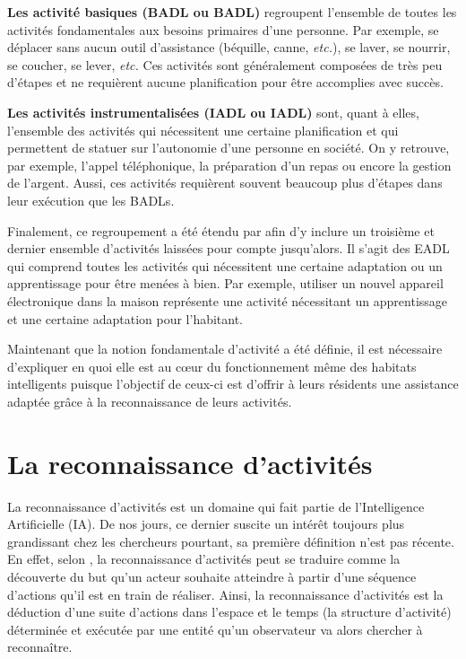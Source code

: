 {\textbf{Les activité basiques (\acl{BADL} ou \acs{BADL})} regroupent l'ensemble de toutes les activités fondamentales aux besoins primaires d'une personne. Par exemple, se déplacer sans aucun outil d'assistance (béquille, canne, \textit{etc.}), se laver, se nourrir, se coucher, se lever, \textit{etc.} Ces activités sont généralement composées de très peu d'étapes et ne requièrent aucune planification pour être accomplies avec succès.

{\textbf{Les activités instrumentalisées (\acl{IADL} ou \acs{IADL})} sont, quant à elles, l'ensemble des activités qui nécessitent une certaine planification et qui permettent de statuer sur l'autonomie d'une personne en société. On y retrouve, par exemple, l'appel téléphonique, la préparation d'un repas ou encore la gestion de l'argent. Aussi, ces activités requièrent souvent beaucoup plus d'étapes dans leur exécution que les \acsp{BADL}.

Finalement, ce regroupement a été étendu par \cite{Rogers1998} afin d'y inclure un troisième et dernier ensemble d'activités laissées pour compte jusqu'alors. Il s'agit des \ac{EADL} qui comprend toutes les activités qui nécessitent une certaine adaptation ou un apprentissage pour être menées à bien. Par exemple, utiliser un nouvel appareil électronique dans la maison représente une activité nécessitant un apprentissage et une certaine adaptation pour l'habitant.

Maintenant que la notion fondamentale d'activité a été définie, il est nécessaire d'expliquer en quoi elle est au c\oe{}ur du fonctionnement même des habitats intelligents puisque l'objectif de ceux-ci est d'offrir à leurs résidents une assistance adaptée grâce à la reconnaissance de leurs activités.

\section{La reconnaissance d'activités}

La reconnaissance d'activités est un domaine qui fait partie de l'Intelligence Artificielle (\acs{IA}). De nos jours, ce dernier suscite un intérêt toujours plus grandissant chez les chercheurs pourtant, sa première définition n'est pas récente. En effet, selon \cite{Schmidt1978}, la reconnaissance d'activités peut se traduire comme la découverte du but qu'un acteur souhaite atteindre à partir d'une séquence d'actions qu'il est en train de réaliser. Ainsi, la reconnaissance d'activités est la déduction d'une suite d'actions dans l'espace et le temps (la structure d'activité) déterminée et exécutée par une entité qu'un observateur va alors chercher à reconnaître.

}}
